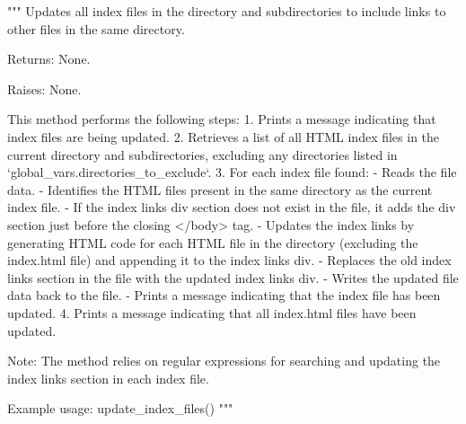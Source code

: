 \begin{codebox}
"""
Updates all index files in the directory and subdirectories to include links to other files in the same directory.

Returns:
	None.

Raises:
	None.

This method performs the following steps:
	1. Prints a message indicating that index files are being updated.
	2. Retrieves a list of all HTML index files in the current directory and subdirectories, excluding any directories listed in `global_vars.directories_to_exclude`.
	3. For each index file found:
		- Reads the file data.
		- Identifies the HTML files present in the same directory as the current index file.
		- If the index links div section does not exist in the file, it adds the div section just before the closing </body> tag.
		- Updates the index links by generating HTML code for each HTML file in the directory (excluding the index.html file) and appending it to the index links div.
		- Replaces the old index links section in the file with the updated index links div.
		- Writes the updated file data back to the file.
		- Prints a message indicating that the index file has been updated.
	4. Prints a message indicating that all index.html files have been updated.

Note: The method relies on regular expressions for searching and updating the index links section in each index file.

Example usage:
	update_index_files()
"""
\end{codebox}


